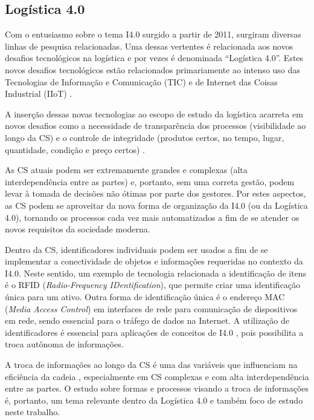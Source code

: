 \subsection{Logística 4.0}

Com o entusiasmo sobre o tema I4.0 surgido a partir de 2011, surgiram diversas linhas de pesquisa relacionadas. Uma dessas vertentes é relacionada aos novos desafios tecnológicos na logística e por vezes é denominada ``Logística 4.0''. Estes novos desafios tecnológicos estão relacionados primariamente ao intenso uso das Tecnologias de Informação e Comunicação (TIC) e de Internet das Coisas Industrial (IIoT) \cite{barreto2017industry}.

A inserção dessas novas tecnologias ao escopo de estudo da logística acarreta em novos desafios como a necessidade de transparência dos processos (visibilidade ao longo da CS) e o controle de integridade (produtos certos, no tempo, lugar, quantidade, condição e preço certos) \cite{barreto2017industry}.

As CS atuais podem ser extremamente grandes e complexas (alta interdependência entre as partes) e, portanto, sem uma correta gestão, podem levar à tomada de decisões não ótimas por parte dos gestores. Por estes aspectos, as CS podem se aproveitar da nova forma de organização da I4.0 (ou da Logística 4.0), tornando os processos cada vez mais automatizados a fim de se atender os novos requisitos da sociedade moderna.

Dentro da CS, identificadores individuais podem ser usados a fim de se implementar a conectividade de objetos e informações requeridas no contexto da I4.0. Neste sentido, um exemplo de tecnologia relacionada a identificação de itens é o RFID (\textit{Radio-Frequency IDentification}), que permite criar uma identificação única para um ativo. Outra forma de identificação única é o endereço MAC (\textit{Media Access Control}) em interfaces de rede para comunicação de dispositivos em rede, sendo essencial para o tráfego de dados na Internet. A utilização de identificadores é essencial para aplicações de conceitos de I4.0 \cite{alyahya2016rfidwarehousing, vlachos2014rfidimpact, fan2015inventory, bibi2017rfidfood}, pois possibilita a troca autônoma de informações.

A troca de informações ao longo da CS é uma das variáveis que influenciam na eficiência da cadeia \cite{barreto2017industry}, especialmente em CS complexas e com alta interdependência entre as partes. O estudo sobre formas e processos visando a troca de informações é, portanto, um tema relevante dentro da Logística 4.0 e também foco de estudo neste trabalho.


